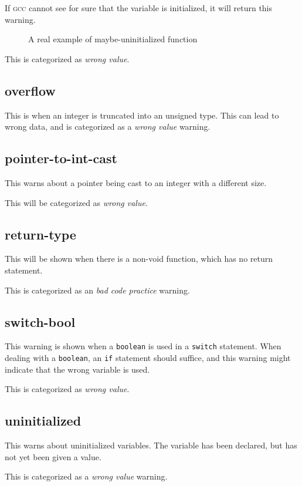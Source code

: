 \documentclass[a4paper,11pt]{report}
\newcommand{\figa}{
    \begin{figure}[!htpb]
    \centering
}
\newcommand{\figb}[2]{
    \caption{#1}
    \label{#2}
    \end{figure}
}
\begin{document}
If \textsc{gcc} cannot see for sure that the variable is initialized, it will 
return this warning.

\figa
    
\figb{A real example of maybe-uninitialized function}{lst:maybeuninitializedreal}

This is categorized as \emph{wrong value}.


            \subsection*{overflow}
This is when an integer is truncated into an unsigned type. This can lead to 
wrong data, and is categorized as a \emph{wrong value} warning.


            \subsection*{pointer-to-int-cast}
This warns about a pointer being cast to an integer with a different size.

This will be categorized as \emph{wrong value}.


            \subsection*{return-type}
This will be shown when there is a non-void function, which has no return 
statement.

This is categorized as an \emph{bad code practice} warning.


            \subsection*{switch-bool}
This warning is shown when a \texttt{boolean} is used in a \texttt{switch} 
statement. When dealing with a \texttt{boolean}, an \texttt{if} statement 
should suffice, and this warning might indicate that the wrong variable is used.

This is categorized as \emph{wrong value}.


            \subsection*{uninitialized}
This warns about uninitialized variables. The variable has been declared, but 
has not yet been given a value.

This is categorized as a \emph{wrong value} warning.
\end{document}
